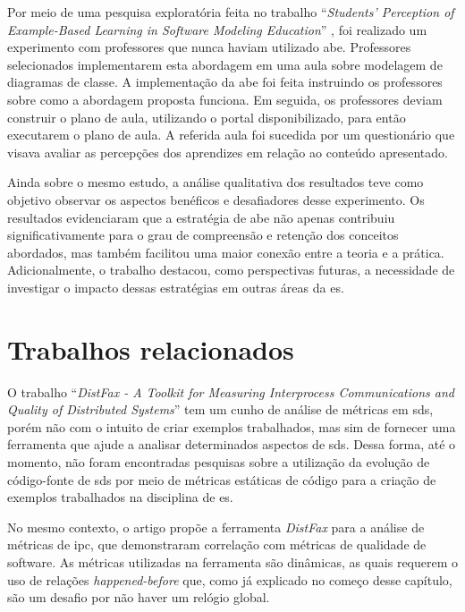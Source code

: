 Por meio de uma pesquisa exploratória feita no trabalho ``\textit{Students’ Perception of Example-Based Learning in Software Modeling Education}'' \cite{Tiago.Bonetti-etal:2023}, foi realizado um experimento com professores que nunca haviam utilizado \gls{abe}. Professores selecionados implementarem esta abordagem em uma aula sobre modelagem de diagramas de classe. A implementação da \gls{abe} foi feita instruindo os professores sobre como a abordagem proposta funciona. Em seguida, os professores deviam construir o plano de aula, utilizando o portal disponibilizado, para então executarem o plano de aula. A referida aula foi sucedida por um questionário que visava avaliar as percepções dos aprendizes em relação ao conteúdo apresentado. 

Ainda sobre o mesmo estudo, a análise qualitativa dos resultados teve como objetivo observar os aspectos benéficos e desafiadores desse experimento. Os resultados evidenciaram que a estratégia de \gls{abe} não apenas contribuiu significativamente para o grau de compreensão e retenção dos conceitos abordados, mas também facilitou uma maior conexão entre a teoria e a prática. Adicionalmente, o trabalho destacou, como perspectivas futuras, a necessidade de investigar o impacto dessas estratégias em outras áreas da \gls{es}.

\section{Trabalhos relacionados}
\label{section:related-work}

O trabalho ``\textit{DistFax - A Toolkit for Measuring Interprocess Communications and Quality of Distributed Systems}''\cite{DistFax} tem um cunho de análise de métricas em \gls{sds}, porém não com o intuito de criar exemplos trabalhados, mas sim de fornecer uma ferramenta que ajude a analisar determinados aspectos de \gls{sds}. Dessa forma, até o momento, não foram encontradas pesquisas sobre a utilização da evolução de código-fonte de \gls{sds} por meio de métricas estáticas de código para a criação de exemplos trabalhados na disciplina de \gls{es}.

No mesmo contexto, o artigo propõe a ferramenta \textit{DistFax} para a análise de métricas de \gls{ipc}, que demonstraram correlação com métricas de qualidade de software. As métricas utilizadas na ferramenta são dinâmicas, as quais requerem o uso de relações \textit{happened-before} que, como já explicado no começo desse capítulo, são um desafio por não haver um relógio global.

